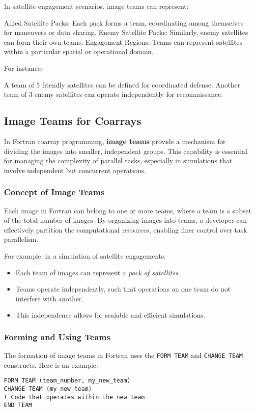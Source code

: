 In satellite engagement scenarios, image teams can represent:

    Allied Satellite Packs: Each pack forms a team, coordinating among themselves for maneuvers or data sharing.
    Enemy Satellite Packs: Similarly, enemy satellites can form their own teams.
    Engagement Regions: Teams can represent satellites within a particular spatial or operational domain.

For instance:

    A team of 5 friendly satellites can be defined for coordinated defense.
    Another team of 3 enemy satellites can operate independently for reconnaissance.
\subsection{Image Teams for Coarrays}

In Fortran coarray programming, \textbf{image teams} provide a mechanism for dividing the images into smaller, independent groups. This capability is essential for managing the complexity of parallel tasks, especially in simulations that involve independent but concurrent operations.

\subsubsection{Concept of Image Teams}
Each image in Fortran can belong to one or more teams, where a team is a subset of the total number of images. By organizing images into teams, a developer can effectively partition the computational resources, enabling finer control over task parallelism.

For example, in a simulation of satellite engagements:
\begin{itemize}
    \item Each team of images can represent a \emph{pack of satellites}.
    \item Teams operate independently, such that operations on one team do not interfere with another.
    \item This independence allows for scalable and efficient simulations.
\end{itemize}

\subsubsection{Forming and Using Teams}
The formation of image teams in Fortran uses the \texttt{FORM TEAM} and \texttt{CHANGE TEAM} constructs. Here is an example:
\begin{verbatim}
FORM TEAM (team_number, my_new_team)
CHANGE TEAM (my_new_team)
! Code that operates within the new team
END TEAM
\end{verbatim}

